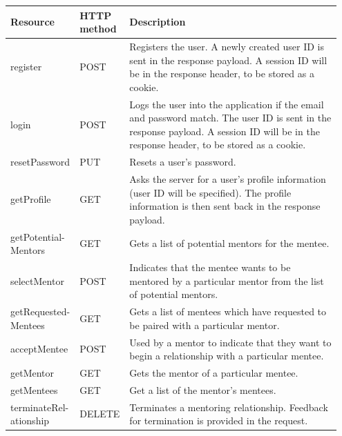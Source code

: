 \documentclass[10pt]{article}
\begin{document}
\begin{longtable}{|p{0.127\linewidth}|p{0.07\linewidth}|p{0.75\linewidth}|}
    \hline \textbf{Resource} & \textbf{HTTP method} & \textbf{Description} \\ \hline\hline
    register
    &
    POST
    &
    Registers the user. A newly created user ID is sent in the response payload. A session ID will be in the response header, to be stored as a cookie.
    \\ \hline

    login
    &
    POST
    &
    Logs the user into the application if the email and password match. The user ID is sent in the response payload. A session ID will be in the response header, to be stored as a cookie.
    \\ \hline

    resetPassword
    &
    PUT
    &
    Resets a user's password.
    \\ \hline

    getProfile
    &
    GET
    &
    Asks the server for a user's profile information (user ID will be specified). The profile information is then sent back in the response payload.
    \\ \hline

    getPotential- Mentors
    &
    GET
    &
    Gets a list of potential mentors for the mentee.
    \\ \hline

    selectMentor
    &
    POST
    &
    Indicates that the mentee wants to be mentored by a particular mentor from the list of potential mentors.
    \\ \hline

    getRequested- Mentees
    &
    GET
    &
    Gets a list of mentees which have requested to be paired with a particular mentor.
    \\ \hline

    acceptMentee
    &
    POST
    &
    Used by a mentor to indicate that they want to begin a relationship with a particular mentee.
    \\ \hline

    getMentor
    &
    GET
    &
    Gets the mentor of a particular mentee.
    \\ \hline

    getMentees
    &
    GET
    &
    Get a list of the mentor's mentees.
    \\ \hline

    terminateRel- ationship
    &
    DELETE
    &
    Terminates a mentoring relationship. Feedback for termination is provided in the request.
    \\ \hline


\end{longtable}
\end{document}
